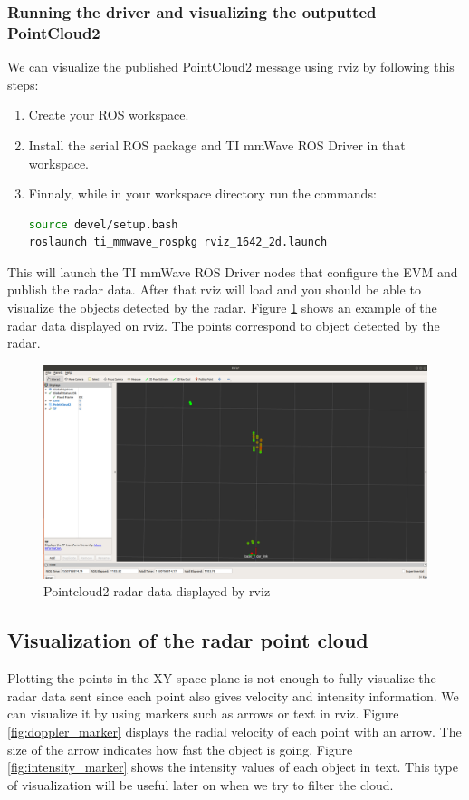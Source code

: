 \documentclass[12pt]{article}
\begin{document}
\subsubsection{Running the driver and visualizing the outputted PointCloud2}
We can visualize the published PointCloud2 message using rviz by following this steps:
\begin{enumerate}
    \item Create your ROS workspace.
    \item Install the serial ROS package and TI mmWave ROS Driver in that workspace.
    \item  Finnaly, while in your workspace directory run the commands:
    \begin{lstlisting}[language=bash]
source devel/setup.bash
roslaunch ti_mmwave_rospkg rviz_1642_2d.launch
\end{lstlisting}
\end{enumerate}
This will launch the TI mmWave ROS Driver nodes that configure the EVM and publish the radar data. After that rviz will load and you should be able to visualize the objects detected by the radar. Figure \ref{fig:radar_rviz} shows an example of the radar data displayed on rviz. The points correspond to object detected by the radar.
\begin{figure}[!htb]
    \centering
    \includegraphics[scale=0.2]{pc_not_filt.png}
    \caption{Pointcloud2 radar data displayed by rviz}
    \label{fig:radar_rviz}
\end{figure}
\subsection{Visualization of the radar point cloud}
Plotting the points in the XY space plane is not enough to fully visualize the radar data sent since each point also gives velocity and intensity information.
We can visualize it by using markers such as arrows or text in rviz.
Figure \ref{fig:doppler_marker} displays the radial velocity of each point with an arrow. The size of the arrow indicates how fast the object is going. Figure \ref{fig:intensity_marker} shows the intensity values of each object in text. This type of visualization will be useful later on when we try to filter the cloud.
\end{document}
